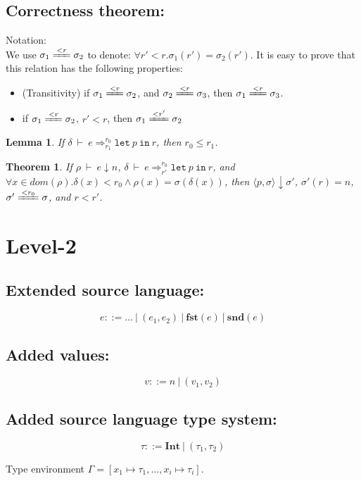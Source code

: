 \documentclass[a4paper]{article}
\newtheorem{thm}[equation]{Theorem}
\newtheorem{lem}[equation]{Lemma}
\def\Fst#1{\mathbf{fst} (#1)}
\def\Snd#1{\mathbf{snd} (#1)}
\def\Int{\mathbf{Int}}
\def\Eva{\downarrow}
\def\Ra{\Rightarrow}
\def\Env{\ \vdash\ }
\def\Sgm{\sigma}
\def\Map#1#2{#1 \mapsto #2}
\def\Eval#1#2#3{#1 \Env #2 \Eva #3 }
\def\TaSem#1#2#3{\langle #1,#2 \rangle \Eva #3}
\def\Talet#1#2{\mathtt{let} \ #1 \ \mathtt{in} \ #2}
\def\Trans#1#2#3#4#5{#1 \Env #2 \Ra^{#4}_{#5} #3}
\def\ConEq#1{\xlongequal{<#1}}  %
\begin{document}
\subsection{Correctness theorem: }
Notation: \\
We use $\Sgm_1 \ConEq{r} \Sgm_2$ to denote: $\forall r' < r. \Sgm_1(r') = \Sgm_2(r')$.
It is easy to prove that this relation has the following properties:
\begin{itemize}
	\item (Transitivity) if $\Sgm_1 \ConEq{r} \Sgm_2$, and $\Sgm_2 \ConEq{r} \Sgm_3 $, then $\Sgm_1 \ConEq{r} \Sgm_3$.
	\item if $\Sgm_1 \ConEq{r} \Sgm_2$, $r' < r$, then $\Sgm_1 \ConEq{r'} \Sgm_2$
\end{itemize}


\begin{lem}
	If $\Trans{\delta}{e}{\Talet{p}{r}}{r_0}{r_1}$, then $r_0 \le r_1$.
	\label{fresh1}
\end{lem}

\begin{thm}
	If $\Eval{\rho}{e}{n}$, $\Trans{\delta}{e}{\Talet{p}{r}} {r_0} {r'}$, and $\forall x \in dom(\rho).\delta(x) < r_0 \wedge \rho(x) = \Sgm(\delta(x))$,
	then $\TaSem{p}{\Sgm}{\Sgm'}$, $\Sgm'(r) = n$,  $\Sgm' \ConEq{r_0} \Sgm$, and $r < r'$. 
\end{thm}


\section{Level-2}
\subsection{Extended source language:}
$$e ::= ... \ |\ (e_1,e_2) \ |\ \Fst{e} \ |\ \Snd{e}$$

\subsection{Added values:}

$$v ::= n \ | \ (v_1,v_2) $$

\subsection{Added source language type system:}
$$ \tau ::= \Int \ | \ (\tau_1,\tau_2) $$

Type environment $\Gamma = [\Map{x_1}{\tau_1}, ..., \Map{x_i}{\tau_i} ]$.
\end{document}
